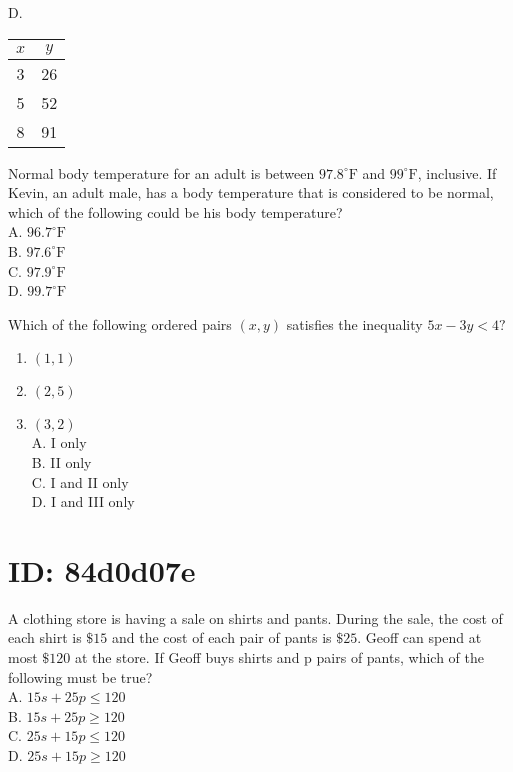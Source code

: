 D.

\begin{center}
\begin{tabular}{|c|c|}
\hline
$x$ & $y$ \\
\hline
3 & 26 \\
\hline
5 & 52 \\
\hline
8 & 91 \\
\hline
\end{tabular}
\end{center}

Normal body temperature for an adult is between $97.8^{\circ} \mathrm{F}$ and $99^{\circ} \mathrm{F}$, inclusive. If\\
Kevin, an adult male, has a body temperature that is considered to be normal, which of the following could be his body temperature?\\
A. $96.7^{\circ} \mathrm{F}$\\
B. $97.6^{\circ} \mathrm{F}$\\
C. $97.9^{\circ} \mathrm{F}$\\
D. $99.7^{\circ} \mathrm{F}$

Which of the following ordered pairs $(x, y)$ satisfies the inequality $5 x-3 y<4 ?$

\begin{enumerate}
  \item $(1,1)$
  \item $(2,5)$
  \item $(3,2)$\\
A. I only\\
B. II only\\
C. I and II only\\
D. I and III only
\end{enumerate}

\section*{ID: 84d0d07e}
A clothing store is having a sale on shirts and pants. During the sale, the cost of each shirt is $\$ 15$ and the cost of each pair of pants is $\$ 25$. Geoff can spend at most $\$ 120$ at the store. If Geoff buys shirts and p pairs of pants, which of the following must be true?\\
A. $15 s+25 p \leq 120$\\
B. $15 s+25 p \geq 120$\\
C. $25 s+15 p \leq 120$\\
D. $25 s+15 p \geq 120$

